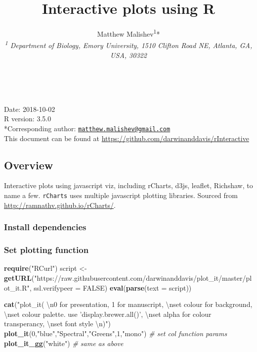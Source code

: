 \documentclass[10,portrait]{article}
\title{Interactive plots using R}
\author{Matthew Malishev\textsuperscript{1}*\\
\emph{\textsuperscript{1} Department of Biology, Emory University, 1510
Clifton Road NE, Atlanta, GA, USA, 30322}}
\date{}
\newenvironment{Shaded}{\begin{snugshade}}{\end{snugshade}}
\newcommand{\KeywordTok}[1]{\textcolor[rgb]{0.13,0.29,0.53}{\textbf{#1}}}
\newcommand{\DataTypeTok}[1]{\textcolor[rgb]{0.13,0.29,0.53}{#1}}
\newcommand{\DecValTok}[1]{\textcolor[rgb]{0.00,0.00,0.81}{#1}}
\newcommand{\CharTok}[1]{\textcolor[rgb]{0.31,0.60,0.02}{#1}}
\newcommand{\StringTok}[1]{\textcolor[rgb]{0.31,0.60,0.02}{#1}}
\newcommand{\CommentTok}[1]{\textcolor[rgb]{0.56,0.35,0.01}{\textit{#1}}}
\newcommand{\OtherTok}[1]{\textcolor[rgb]{0.56,0.35,0.01}{#1}}
\newcommand{\NormalTok}[1]{#1}
\begin{document}
\maketitle

{
\hypersetup{linkcolor=black}
\setcounter{tocdepth}{4}
\tableofcontents
}
~

Date: 2018-10-02\\
R version: 3.5.0\\
*Corresponding author:
\href{mailto:matthew.malishev@gmail.com}{\nolinkurl{matthew.malishev@gmail.com}}\\
This document can be found at
\url{https://github.com/darwinanddavis/rInteractive}

\newpage  

\subsection{Overview}\label{overview}

Interactive plots using javascript viz, including rCharts, d3js,
leaflet, Richshaw, to name a few. \texttt{rCharts} uses multiple
javascript plotting libraries. Sourced from
\url{http://ramnathv.github.io/rCharts/}.

\subsubsection{Install dependencies}\label{install-dependencies}

\subsubsection{Set plotting function}\label{set-plotting-function}

\begin{Shaded}
\begin{Highlighting}[]
\KeywordTok{require}\NormalTok{(}\StringTok{"RCurl"}\NormalTok{)}
\NormalTok{script <-}\StringTok{ }\KeywordTok{getURL}\NormalTok{(}\StringTok{"https://raw.githubusercontent.com/darwinanddavis/plot_it/master/plot_it.R"}\NormalTok{, }\DataTypeTok{ssl.verifypeer =} \OtherTok{FALSE}\NormalTok{)}
\KeywordTok{eval}\NormalTok{(}\KeywordTok{parse}\NormalTok{(}\DataTypeTok{text =}\NormalTok{ script))}

\KeywordTok{cat}\NormalTok{(}\StringTok{"plot_it( }\CharTok{\textbackslash{}n}\StringTok{0 for presentation, 1 for manuscript, }\CharTok{\textbackslash{}n}\StringTok{set colour for background, }\CharTok{\textbackslash{}n}\StringTok{set colour palette. use 'display.brewer.all()', }\CharTok{\textbackslash{}n}\StringTok{set alpha for colour transperancy, }\CharTok{\textbackslash{}n}\StringTok{set font style }\CharTok{\textbackslash{}n}\StringTok{)"}\NormalTok{)}
\KeywordTok{plot_it}\NormalTok{(}\DecValTok{0}\NormalTok{,}\StringTok{"blue"}\NormalTok{,}\StringTok{"Spectral"}\NormalTok{,}\StringTok{"Greens"}\NormalTok{,}\DecValTok{1}\NormalTok{,}\StringTok{"mono"}\NormalTok{) }\CommentTok{# set col function params}
\KeywordTok{plot_it_gg}\NormalTok{(}\StringTok{"white"}\NormalTok{) }\CommentTok{# same as above }
\end{Highlighting}
\end{Shaded}
\end{document}
